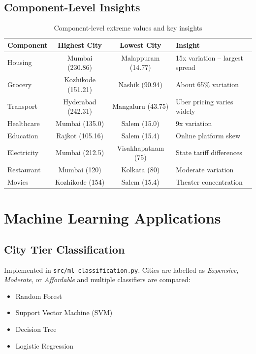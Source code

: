 \documentclass[12pt,a4paper]{article}
\begin{document}
\subsection{Component-Level Insights}

\begin{table}[H]
  \centering
  \begin{tabular}{lccp{4.5cm}}
    \toprule
    \textbf{Component} & \textbf{Highest City} & \textbf{Lowest City} & \textbf{Insight} \\
    \midrule
    Housing     & Mumbai (230.86)    & Malappuram (14.77) & 15x variation -- largest spread \\
    Grocery     & Kozhikode (151.21) & Nashik (90.94)     & About 65\% variation \\
    Transport   & Hyderabad (242.31) & Mangaluru (43.75)  & Uber pricing varies widely \\
    Healthcare  & Mumbai (135.0)     & Salem (15.0)       & 9x variation \\
    Education   & Rajkot (105.16)    & Salem (15.4)       & Online platform skew \\
    Electricity & Mumbai (212.5)     & Visakhapatnam (75) & State tariff differences \\
    Restaurant  & Mumbai (120)       & Kolkata (80)       & Moderate variation \\
    Movies      & Kozhikode (154)    & Salem (15.4)       & Theater concentration \\
    \bottomrule
  \end{tabular}
  \caption{Component-level extreme values and key insights}
\end{table}

\section{Machine Learning Applications}

\subsection{City Tier Classification}

Implemented in \texttt{src/ml\_classification.py}. Cities are labelled as
\textit{Expensive}, \textit{Moderate}, or \textit{Affordable} and multiple
classifiers are compared:

\begin{itemize}
  \item Random Forest
  \item Support Vector Machine (SVM)
  \item Decision Tree
  \item Logistic Regression
\end{itemize}
\end{document}
